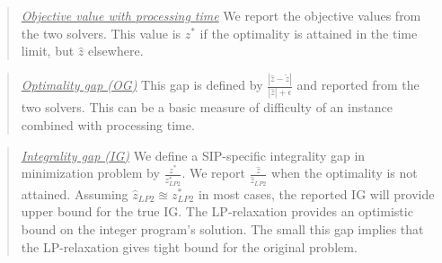 \begin{quote}
	\noindent\underline{\textit{Objective value with processing time}} We report the objective values from the two solvers. This value is $z^*$ if the optimality is attained in the time limit, but $\hat{z}$ elsewhere.
\end{quote}

\begin{quote}
	\noindent\underline{\textit{Optimality gap (OG)}} This gap is defined by $\frac{|\hat{z}-\tilde{z}|}{|\hat{z}|+\epsilon}$ and  reported from the two solvers. This can be a basic measure of difficulty of an instance combined with processing time.
\end{quote}


\begin{quote}
	\noindent\underline{\textit{Integrality gap (IG)}} We define a SIP-specific integrality gap in minimization problem by $\frac{z^*}{z^*_{LP2}}$. We report $\frac{\hat{z}}{\hat{z}_{LP2}}$ when the optimality is not attained. Assuming $\hat{z}_{LP2}\approxeq z^*_{LP2}$ in most cases, the reported IG will provide upper bound for the true IG. The LP-relaxation provides an optimistic bound on the integer program's solution. The small this gap implies that the LP-relaxation gives tight bound for the original problem.  %
\end{quote}

